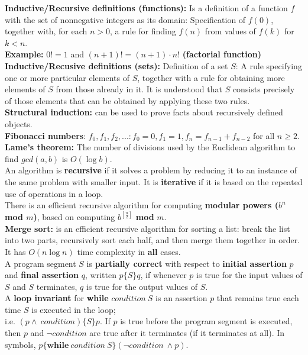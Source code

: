 \documentclass[12pt]{article}
\begin{document}
\textbf{Inductive/Recursive definitions (functions):} Is a definition of a function $f$ with the set of nonnegative integers as its domain: Specification of $f(0)$, together with, for each $n > 0$, a rule for finding $f(n)$ from values of $f(k)$ for $k < n$. \\
\textbf{Example:} $0! = 1$ and $(n + 1)! = (n + 1) \cdot n!$ \textbf{(factorial function)} \\
\medskip
\textbf{Inductive/Recusive definitions (sets):} Definition of a set $S$: A rule specifying one or more particular elements of $S$, together with a rule for obtaining more elements of $S$ from those already in it. It is understood that $S$ consists precisely of those elements that can be obtained by applying these two rules. \\
\textbf{Structural induction:} can be used to prove facts about recursively defined objects. \\
\textbf{Fibonacci numbers}: $f_0,f_1,f_2,...: f_0 = 0, f_1 = 1,f_n = f_{n-1} + f_{n-2}$ for all $ n \geq 2$. \\
\textbf{Lame's theorem:} The number of divisions used by the Euclidean algorithm to find $gcd(a,b)$ is $O(\log b)$. \\
An algorithm is \textbf{recursive} if it solves a problem by reducing it to an instance of the same problem with smaller input. It is \textbf{iterative} if it is based on the repeated use of operations in a loop. \\
There is an efficient recursive algorithm for computing \textbf{modular powers ($b^n$ mod $m$)}, based on computing $b^{[\frac{n}{2}]}$ \textbf{mod} $m$. \\
\textbf{Merge sort:} is an efficient recursive algorithm for sorting a list: break the list into two parts, recursively sort each half, and then merge them together in order. It has $O(n\log n)$ time complexity in \textbf{all} cases. \\
A program segment $S$ is \textbf{partially correct} with respect to \textbf{initial assertion} $p$ and \textbf{final assertion} $q$, written $p\{S\}q$, if whenever $p$ is true for the input values of $S$ and $S$ terminates, $q$ is true for the output values of $S$. \\
A \textbf{loop invariant} for \textbf{while} $condition\ S$ is an assertion $p$ that remains true each time $S$ is executed in the loop; \\
i.e. $(p\wedge\ condition)\{S\}p$. If $p$ is true before the program segment is executed, then $p$ and $\neg condition$ are true after it terminates (if it terminates at all). In symbols, $p\{\textbf{while}\ condition\ S\}(\neg condition\ \wedge p)$.
\newpage
\end{document}
